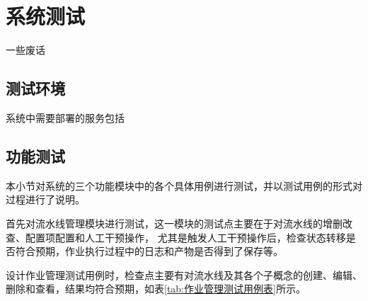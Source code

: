 
\chapter{系统测试}
一些废话
\section{测试环境}
系统中需要部署的服务包括

\section{功能测试}
本小节对系统的三个功能模块中的各个具体用例进行测试，并以测试用例的形式对过程进行了说明。

首先对流水线管理模块进行测试，这一模块的测试点主要在于对流水线的增删改查、配置项配置和人工干预操作，
尤其是触发人工干预操作后，检查状态转移是否符合预期，作业执行过程中的日志和产物是否得到了保存等。

设计作业管理测试用例时，检查点主要有对流水线及其各个子概念的创建、编辑、删除和查看，结果均符合预期，如表\ref{tab:作业管理测试用例表}所示。

